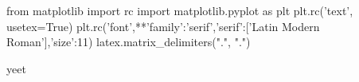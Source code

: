 \documentclass[letterpaper,11pt,dvipsnames]{article}
\begin{document}
\begin{sagesilent}
    from matplotlib import rc
    import matplotlib.pyplot as plt
    plt.rc('text', usetex=True)
    plt.rc('font',**{'family':'serif','serif':['Latin Modern Roman'],'size':11})
    latex.matrix_delimiters(".", ".")
\end{sagesilent}

yeet
	
\end{document}
